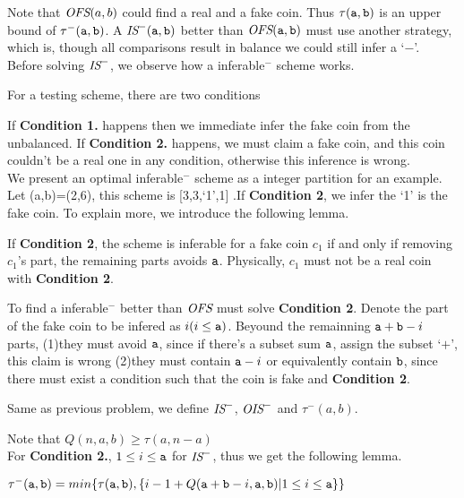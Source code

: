 Note that $\text{\it OFS}(a,b)$ could find a real and a fake coin. Thus $\tau(\mathtt{a},\mathtt{b})$ is an upper bound of $\tau^-(\mathtt{a},\mathtt{b})$.
A $\text{\it IS}^-(\mathtt{a},\mathtt{b})$ better than $\text{\it OFS}(\mathtt{a},\mathtt{b})$ must use another strategy, which is, though all comparisons result in balance we could still infer a `$-$'.\\

Before solving $\text{\it IS}^-$, we observe how a inferable$^-$ scheme works.

For a testing scheme, there are two conditions

If \textbf{Condition 1.} happens then we immediate infer the fake coin from the unbalanced.
If \textbf{Condition 2.} happens, we must claim a fake coin, and this coin couldn't be a real one in any condition, otherwise this inference is wrong.\\

We present an optimal inferable$^-$ scheme as a integer partition for an example. Let (a,b)=(2,6), 
this scheme is [3,3,`1',1] .If \textbf{Condition 2}, we infer the `1' is the fake coin. To explain more, we introduce the following lemma.

\begin{lemma}\label{lma:inferable}
If \textbf{Condition 2}, the scheme is inferable for a fake coin $c_1$ if and only if removing $c_1$'s part, the remaining parts avoids $\mathtt{a}$. Physically, $c_1$ must not be a real coin with \textbf{Condition 2}.
\end{lemma}

To find a inferable$^-$ better than $\text{\it OFS}$ must solve \textbf{Condition 2}.
Denote the part of the fake coin to be infered as $i(i\leq\mathtt{a})$. 
Beyound the remainning $\mathtt{a}+\mathtt{b}-i$ parts, 
(1)they must avoid $\mathtt{a}$, since if there's a subset sum $\mathtt{a}$, assign the subset `$+$', this claim is wrong
(2)they must contain $\mathtt{a}-i$ or equivalently contain $\mathtt{b}$, since there must exist a condition such that the coin is fake and \textbf{Condition 2}.


\begin{definition}
Same as previous problem, we define $\text{\it IS}^-$, $\text{\it OIS}^-$ and $\tau^-(a,b)$.
\end{definition}

Note that $Q(n,a,b)\geq\tau(a,n-a)$\\

For \textbf{Condition 2.}, $1\leq i\leq\mathtt{a}$ for $\text{\it IS}^-$, thus we get the following lemma.

\begin{lemma}
$\tau^-(\mathtt{a},\mathtt{b})=min\{\tau(\mathtt{a},\mathtt{b}), \{i-1+Q(\mathtt{a}+\mathtt{b}-i,\mathtt{a},\mathtt{b}) | 1\leq i\leq\mathtt{a}\} \}$
\end{lemma}

